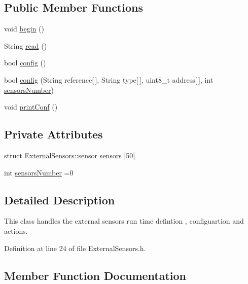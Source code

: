 \subsection*{Public Member Functions}
\begin{DoxyCompactItemize}
\item 
void \hyperlink{class_external_sensors_a58ede0d786a86417254708870f04a21e}{begin} ()
\item 
String \hyperlink{class_external_sensors_a53177b81eca3be89508b5511ddcd00fc}{read} ()
\item 
bool \hyperlink{class_external_sensors_a862a4bd11346b37270d0244c2adabe5a}{config} ()
\item 
bool \hyperlink{class_external_sensors_ac829858f587e15a3fcb00567248f0edd}{config} (String reference\mbox{[}$\,$\mbox{]}, String type\mbox{[}$\,$\mbox{]}, uint8\+\_\+t address\mbox{[}$\,$\mbox{]}, int \hyperlink{class_external_sensors_a58e4fbf9adeae787d92be5fa33043b5d}{sensors\+Number})
\item 
void \hyperlink{class_external_sensors_a78c2bf55084435dd51d3c559b2d3c6f3}{print\+Conf} ()
\end{DoxyCompactItemize}
\subsection*{Private Attributes}
\begin{DoxyCompactItemize}
\item 
struct \hyperlink{struct_external_sensors_1_1sensor}{External\+Sensors\+::sensor} \hyperlink{class_external_sensors_a284233f884fcf00154a44740cf1d9e1e}{sensors} \mbox{[}50\mbox{]}
\item 
int \hyperlink{class_external_sensors_a58e4fbf9adeae787d92be5fa33043b5d}{sensors\+Number} =0
\end{DoxyCompactItemize}


\subsection{Detailed Description}
This class handles the external sensors run time defintion , configuartion and actions. 

Definition at line 24 of file External\+Sensors.\+h.



\subsection{Member Function Documentation}
\mbox{\label{class_external_sensors_a58ede0d786a86417254708870f04a21e}} 
